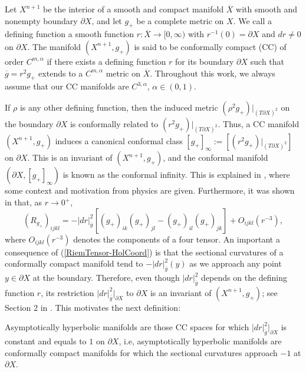\documentclass{amsart}
\begin{document}
\begin{definition}
Let $X^{n+1}$ be the interior of a smooth and compact manifold $\overline X$ with smooth and nonempty boundary $\partial X$, and let $g_+$ be a complete metric on $X$. We call a defining function a smooth function $r:\overline X\to [0,\infty)$ with $r^{-1}({0}) = \partial X$ and $dr\not = 0$ on $\partial X$. The manifold $(X^{n+1},g_+)$ is said to be conformally compact (CC) of order $C^{m,\alpha}$ if there exists a defining function $r$ for its boundary $\partial X$ such that $\overline g = r^2g_+$ extends to a $C^{m,\alpha}$ metric on $\overline{X}$. Throughout this work, we always assume that our CC manifolds are $C^{3,\alpha}$, $\alpha\in(0,1)$.
\end{definition}
If $\rho$ is any other defining function, then the induced metric $(\rho^2g_+)|_{(T\partial X)^2}$ on the boundary $\partial X$ is conformally related to $(r^2g_+)|_{(T\partial X)^2}$. Thus, a CC manifold $(X^{n+1},g_+)$ induces a canonical conformal class $[g_+]_\infty:= [(r^2g_+)|_{(T\partial X)^2}]$ on $\partial X$. This is an invariant of $(X^{n+1},g_+)$, and the conformal manifold $(\partial X,[g_+]_\infty)$ is known as the conformal infinity. This is explained in \cite{Graham}, where some context and motivation from physics are given. Furthermore, it was shown in \cite{mazzeo1986hodge} that, as $r\to 0^+$,
\begin{equation}\label{RiemTensor-HolCoord}
    (R_{g_+})_{ijkl} = -|dr|^2_{\overline g}[(g_+)_{ik}(g_+)_{jl} - (g_+)_{il}(g_+)_{jk}] + O_{ijkl}(r^{-3}),
\end{equation}
where $O_{ijkl}(r^{-3})$ denotes the components of a four tensor. An important a consequence of (\ref{RiemTensor-HolCoord}) is that the sectional curvatures of a conformally compact manifold tend to $-|dr|^2_{\bar g}(y)$ as we approach any point $y\in \partial X$ at the boundary. Therefore, even though $|dr|^2_{\bar g}$ depends on the defining function $r$, its restriction $|dr|^2_{\bar g}|_{\partial X}$ to $\partial X$ is an invariant of $(X^{n+1},g_+)$; see Section 2 in \cite{Graham}. This motivates the next definition: 

\begin{definition}
Asymptotically hyperbolic manifolds are those CC spaces for which $|dr|^2_{\bar g}|_{\partial X}$ is constant and equals to $1$ on $\partial X$, i.e, asymptotically hyperbolic manifolds are conformally compact manifolds for which the sectional curvatures approach $-1$ at $\partial X$. 
\end{definition}
\end{document}
